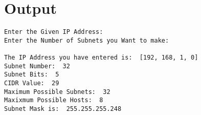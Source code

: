 \documentclass[11pt]{article}
\begin{document}
\section{ Output}
\begin{lstlisting}
Enter the Given IP Address: 
Enter the Number of Subnets you Want to make: 

The IP Address you have entered is:  [192, 168, 1, 0]
Subnet Number:  32
Subnet Bits:  5
CIDR Value:  29
Maximum Possible Subnets:  32
Maxixmum Possible Hosts:  8
Subnet Mask is:  255.255.255.248
\end{lstlisting}
% 
\end{document}
